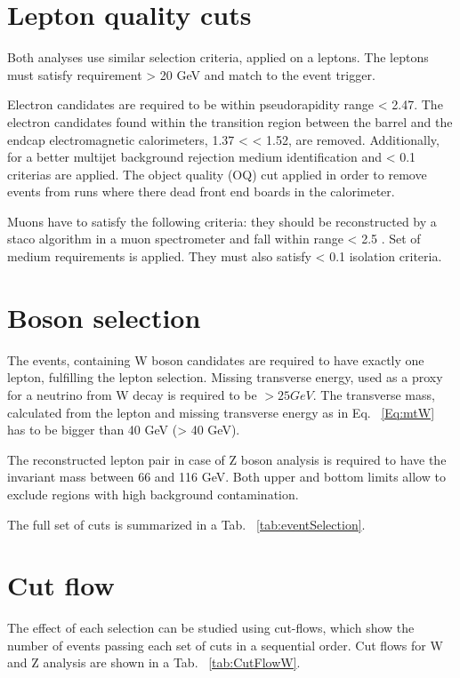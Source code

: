 \section{Lepton quality cuts}

Both analyses use similar selection criteria, applied on a leptons. The leptons must satisfy requirement \ptl > 20 GeV and match to the event trigger.

Electron candidates are required to be within pseudorapidity range \etall < 2.47. The electron candidates found within the transition region between the barrel and the endcap electromagnetic calorimeters, 1.37 < \etall < 1.52, are removed.  Additionally, for a better multijet background rejection  medium identification and \ptcone < 0.1 criterias are applied. The object quality (OQ) cut applied in order to remove events from runs where there dead front end boards in the calorimeter. 

Muons have to satisfy the following criteria: they should be reconstructed by a staco algorithm in a muon spectrometer and fall within range \etall < 2.5 . Set of medium requirements is applied. They must also satisfy \ptcone < 0.1 isolation criteria.

\section{Boson selection}
The events, containing W boson candidates are required to have exactly one lepton, fulfilling the lepton selection. Missing transverse energy, used as a proxy for a neutrino from W decay is required to be \etmiss $>25 GeV$.  The transverse mass, calculated from the lepton and missing transverse energy as in Eq. ~\ref{Eq:mtW} has to be bigger than 40 GeV (\mtw > 40 GeV). 

The reconstructed lepton pair in case of Z boson analysis is required to have the invariant mass between 66 and 116 GeV. Both upper and bottom limits allow to exclude regions with high background contamination. 

The full set of cuts is summarized in a Tab. ~\ref{tab:eventSelection}.

\section{Cut flow}

The effect of each selection can be studied using cut-flows, which show the number of events passing each set of cuts in a sequential order. Cut flows for W and Z analysis are shown in a Tab. ~\ref{tab:CutFlowW}.

